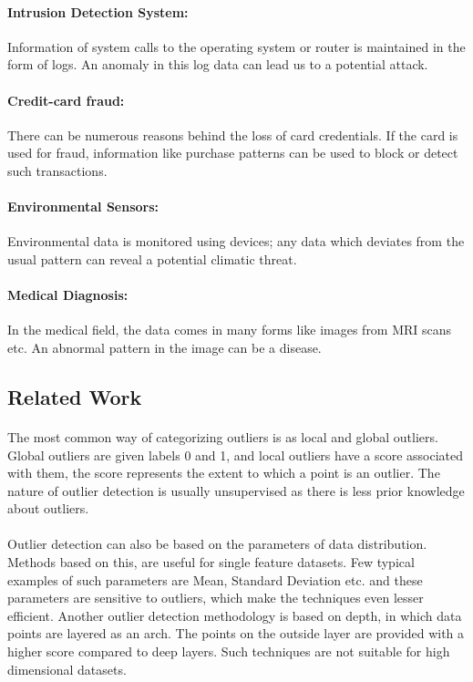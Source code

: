 \documentclass[runningheads]{llncs}
\begin{document}
\paragraph{Intrusion Detection System: } Information of system calls to the operating system or router is maintained in the form of logs. An anomaly in this log data can lead us to a potential attack.
\paragraph{Credit-card fraud:} There can be numerous reasons behind the loss of card credentials. If the card is used for fraud, information like purchase patterns can be used to block or detect such transactions.
\paragraph{Environmental Sensors:} Environmental data is monitored using devices; any data which deviates from the usual pattern can reveal a potential climatic threat.
\paragraph{Medical Diagnosis:} In the medical field, the data comes in many forms like images from MRI scans etc. An abnormal pattern in the image can be a disease.

\subsection{Related Work}




\paragraph{} The most common way of categorizing outliers is as local and global outliers. Global outliers are given labels 0 and 1, and local outliers have a score associated with them, the score represents the extent to which a point is an outlier. The nature of outlier detection is usually unsupervised as there is less prior knowledge about outliers.

\paragraph{} Outlier detection can also be based on the parameters of data distribution. Methods based on this, are useful for single feature datasets. Few typical examples of such parameters are Mean, Standard Deviation etc. and these parameters are sensitive to outliers, which make the techniques even lesser efficient. Another outlier detection methodology is based on depth, in which data points are layered as an arch. The points on the outside layer are provided with a higher score compared to deep layers. Such techniques are not suitable for high dimensional datasets.
\end{document}
